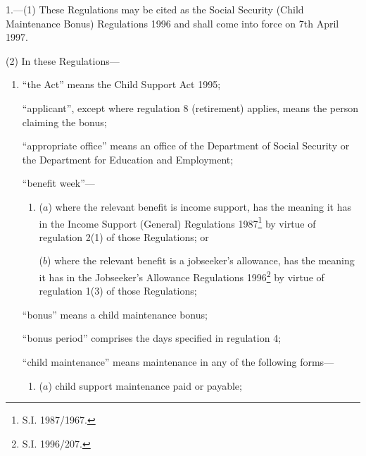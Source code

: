 \documentclass[12pt,a4paper]{article}
\begin{document}
1.—(1) These Regulations may be cited as the Social Security (Child Maintenance Bonus) Regulations 1996 and shall come into force on 7th April 1997.

(2) In these Regulations—
\begin{enumerate}\item[]
“the Act” means the Child Support Act 1995;

“applicant”, except where regulation 8 (retirement) applies, means the person claiming the bonus;

“appropriate office” means an office of the Department of Social Security or the Department for Education and Employment;

“benefit week”—
\begin{enumerate}\item[]
($a$) where the relevant benefit is income support, has the meaning it has in the Income Support (General) Regulations 1987\footnote{\frenchspacing S.I. 1987/1967.} by virtue of regulation 2(1) of those Regulations; or

($b$) where the relevant benefit is a jobseeker’s allowance, has the meaning it has in the Jobseeker’s Allowance Regulations 1996\footnote{\frenchspacing S.I. 1996/207.} by virtue of regulation 1(3) of those Regulations;
\end{enumerate}

“bonus” means a child maintenance bonus;

“bonus period” comprises the days specified in regulation 4;

%
%

“child maintenance” means maintenance in any of the following forms—
\begin{enumerate}\item[]
    ($a$) 
    child support maintenance paid or payable;


\end{enumerate}
\end{enumerate}
\end{document}
